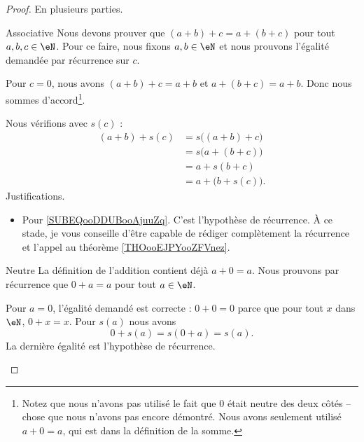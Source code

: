 \begin{proof}
	En plusieurs parties.
	\begin{subproof}
		\item[Associative]
		Nous devons prouver que \( (a+b)+c=a+(b+c)\) pour tout \( a,b,c\in \eN\). Pour ce faire, nous fixons \( a,b\in\eN\) et nous prouvons l'égalité demandée par récurrence sur \( c\).

		Pour \( c=0\), nous avons \( (a+b)+c=a+b\) et \( a+(b+c)=a+b\). Donc nous sommes d'accord\footnote{Notez que nous n'avons pas utilisé le fait que \( 0\) était neutre des deux côtés -- chose que nous n'avons pas encore démontré. Nous avons seulement utilisé \( a+0=a\), qui est dans la définition de la somme.}.

		Nous vérifions avec \( s(c)\) :
		\begin{subequations}
			\begin{align}
				(a+b)+s(c) & =s\big( (a+b)+c \big)                              \\
				           & =s\big( a+(b+c) \big)  \label{SUBEQooDDUBooAjuuZq} \\
				           & =a+s(b+c)                                          \\
				           & =a+\big( b+s(c) \big).
			\end{align}
		\end{subequations}
		Justifications.
		\begin{itemize}
			\item Pour \eqref{SUBEQooDDUBooAjuuZq}. C'est l'hypothèse de récurrence. À ce stade, je vous conseille d'être capable de rédiger complètement la récurrence et l'appel au théorème \ref{THOooEJPYooZFVnez}.
		\end{itemize}
		\item[Neutre]
		La définition de l'addition contient déjà \( a+0=a\). Nous prouvons par récurrence que \( 0+a=a\) pour tout \( a\in \eN\).

		Pour \( a=0\), l'égalité demandé est correcte : \( 0+0=0\) parce que pour tout \( x\) dans \( \eN\), \( 0+x=x\). Pour \( s(a)\) nous avons
		\begin{equation}
			0+s(a)=s(0+a)=s(a).
		\end{equation}
		La dernière égalité est l'hypothèse de récurrence.


\end{subproof}
\end{proof}
